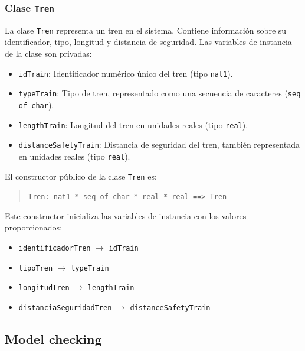 \documentclass[journal]{IEEEtran}
\begin{document}



    \subsubsection*{Clase \texttt{Tren}}

    La clase \texttt{Tren} representa un tren en el sistema. Contiene información sobre su identificador, tipo, longitud y distancia de seguridad. Las variables de instancia de la clase son privadas:

    \begin{itemize}
    \item \texttt{idTrain}: Identificador numérico único del tren (tipo \texttt{nat1}).
    \item \texttt{typeTrain}: Tipo de tren, representado como una secuencia de caracteres (\texttt{seq of char}).
    \item \texttt{lengthTrain}: Longitud del tren en unidades reales (tipo \texttt{real}).
    \item \texttt{distanceSafetyTrain}: Distancia de seguridad del tren, también representada en unidades reales (tipo \texttt{real}).
    \end{itemize}

    El constructor público de la clase \texttt{Tren} es:

    \begin{quote}
    \texttt{Tren: nat1 * seq of char * real * real \texttt{==>} Tren}
    \end{quote}

    Este constructor inicializa las variables de instancia con los valores proporcionados:

    \begin{itemize}
    \item \texttt{identificadorTren} $\rightarrow$ \texttt{idTrain}
    \item \texttt{tipoTren} $\rightarrow$ \texttt{typeTrain}
    \item \texttt{longitudTren} $\rightarrow$ \texttt{lengthTrain}
    \item \texttt{distanciaSeguridadTren} $\rightarrow$ \texttt{distanceSafetyTrain}
    \end{itemize}



\subsection{Model checking}


\sloppy

\end{document}
